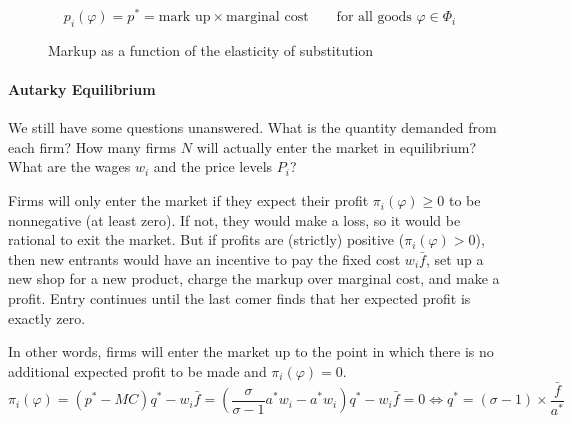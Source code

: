 \documentclass[11pt,letterpaper]{article}
\begin{document}
\begin{equation*}
    \boxed{
    p_i(\varphi) = p^* = \text{mark up} \times \text{marginal cost} \qquad \text{for all goods } \varphi \in \Phi_i
    }
\end{equation*}


    \begin{figure}[htp]
        \centering
            \caption{Markup as a function of the elasticity of substitution}
        \label{fig: ces-markup}
    \end{figure}

\paragraph{Autarky Equilibrium} We still have some questions unanswered. What is the quantity demanded from each firm? How many firms $N$ will actually enter the market in equilibrium? What are the wages $w_i$ and the price levels $P_i$?

Firms will only enter the market if they expect their profit $\pi_i(\varphi) \ge0$ to be nonnegative (at least zero). If not, they would make a loss, so it would be rational to exit the market. But if profits are (strictly) positive ($\pi_i(\varphi) >0$), then new entrants would have an incentive to pay the fixed cost $w_i \bar{f}$, set up a new shop for a new product, charge the markup over marginal cost, and make a profit. Entry continues until the last comer finds that her expected profit is exactly zero.

In other words, firms will enter the market up to the point in which there is no additional expected profit to be made and $\pi_i(\varphi) =0$.
\begin{equation*}
    \pi_i(\varphi) = (p^* - MC) q^* - w_i \bar{f} = \left(\frac{\sigma}{\sigma -1}a^*w_i - a^* w_i\right) q^* - w_i \bar{f} =0 \iff q^* = (\sigma-1) \times \frac{\bar{f}}{a^*}  
\end{equation*}
\end{document}
